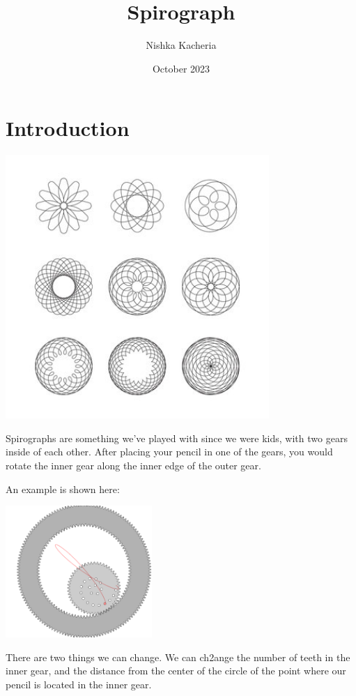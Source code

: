\documentclass{article}
\title{Spirograph}
\author{Nishka Kacheria}
\date{October 2023}
\theoremstyle{remark}
\theoremstyle{problem}
\numberwithin{problem}{subsection}
\numberwithin{Problem}{section}
\theoremstyle{definition}
\theoremstyle{definition}
\begin{document}
\maketitle

\section{Introduction}
\begin{center}
\includegraphics[height=10cm]{images/Spirograph Examples.jpg}
\end{center}

Spirographs are something we've played with since we were kids, with two gears inside of each other. After placing your pencil in one of the gears, you would rotate the inner gear along the inner edge of the outer gear. 

An example is shown here:

\begin{center}
\includegraphics[height=5cm]{images/Spirograph Example.png}
\end{center}

There are two things we can change. We can ch2ange the number of teeth in the inner gear, and the distance from the center of the circle of the point where our pencil is located in the inner gear.
\end{document}
